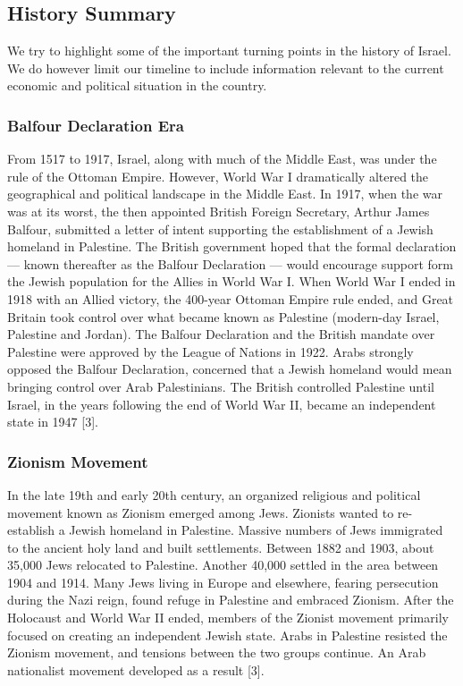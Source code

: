 \documentclass[10pt]{article}
\begin{document}
\subsection{History Summary}

We try to highlight some of the important turning points in the history of Israel. We do however limit our timeline to include information relevant to the current economic and political situation in the country.

\subsubsection{Balfour Declaration Era}
From 1517 to 1917, Israel, along with much of the Middle East, was under the rule of the Ottoman Empire. However, World War I dramatically altered the geographical and political landscape in the Middle East. In 1917, when the war was at its worst, the then appointed British Foreign Secretary, Arthur James Balfour, submitted a letter of intent supporting the establishment of a Jewish homeland in Palestine. The British government hoped that the formal declaration — known thereafter as the Balfour Declaration — would encourage support form the Jewish population for the Allies in World War I. When World War I ended in 1918 with an Allied victory, the 400-year Ottoman Empire rule ended, and Great Britain took control over what became known as Palestine (modern-day Israel, Palestine and Jordan). The Balfour Declaration and the British mandate over Palestine were approved by the League of Nations in 1922. Arabs strongly opposed the Balfour Declaration, concerned that a Jewish homeland would mean bringing control over Arab Palestinians. The British controlled Palestine until Israel, in the years following the end of World War II, became an independent state in 1947 [3].

\subsubsection{Zionism Movement}
In the late 19th and early 20th century, an organized religious and political movement known as Zionism emerged among Jews. Zionists wanted to re-establish a Jewish homeland in Palestine. Massive numbers of Jews immigrated to the ancient holy land and built settlements. Between 1882 and 1903, about 35,000 Jews relocated to Palestine. Another 40,000 settled in the area between 1904 and 1914.
Many Jews living in Europe and elsewhere, fearing persecution during the Nazi reign, found refuge in Palestine and embraced Zionism. After the Holocaust and World War II ended, members of the Zionist movement primarily focused on creating an independent Jewish state. Arabs in Palestine resisted the Zionism movement, and tensions between the two groups continue. An Arab nationalist movement developed as a result [3].
\end{document}
